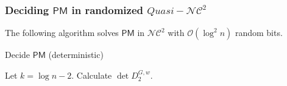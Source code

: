 \documentclass{beamer}
\theoremstyle{remark}
\newcommand{\dpm}{\mathsf{PM}}
\newcommand{\nc}{{\mathcal{NC}}}
\newcommand{\OO}{\mathcal{O}}
\begin{document}
\begin{frame}
  \frametitle{Deciding $\dpm$ in randomized $Quasi-\nc^2$}
  The following algorithm solves $\dpm$ in $\nc^2$
  with $\OO(\log^2 n)$ random bits.

  \begin{algorithm}[H]
    \caption{Decide $\dpm$ (deterministic)}
    \begin{algorithmic}
      \STATE Let $k = \log n - 2$.
      \STATE Calculate $\det D_2^{G, w}$.
      \ENDIF
      \ENDFOR
    \end{algorithmic}
  \end{algorithm}
\end{frame}
\end{document}
